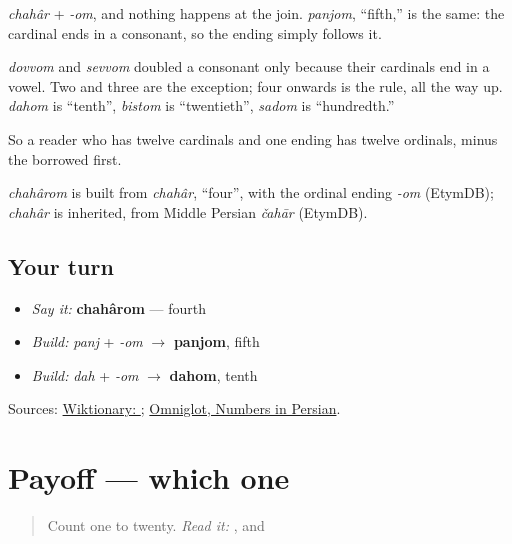 \emph{chahâr} + \emph{-om}, and nothing happens at the join. \emph{panjom}, \textquotedblleft{}fifth,\textquotedblright{} is the same: the cardinal ends in a consonant, so the ending simply follows it.

\emph{dovvom} and \emph{sevvom} doubled a consonant only because their cardinals end in a vowel. Two and three are the exception; four onwards is the rule, all the way up. \emph{dahom} is \textquotedblleft{}tenth\textquotedblright{}, \emph{bistom} is \textquotedblleft{}twentieth\textquotedblright{}, \emph{sadom} is \textquotedblleft{}hundredth.\textquotedblright{}

So a reader who has twelve cardinals and one ending has twelve ordinals, minus the borrowed first.

\begin{cousinweb}
\emph{chahârom} is built from \emph{chahâr}, \textquotedblleft{}four\textquotedblright{}, with the ordinal ending \emph{-om} (EtymDB); \emph{chahâr} is inherited, from Middle Persian \emph{čahār} (EtymDB).
\end{cousinweb}

\subsection*{Your turn}
\begin{itemize}
\raggedright
  \item \emph{Say it:} \textbf{chahârom} — fourth
  \item \emph{Build:} \emph{panj} + \emph{-om} $\to$ \textbf{panjom}, fifth
  \item \emph{Build:} \emph{dah} + \emph{-om} $\to$ \textbf{dahom}, tenth
\end{itemize}

\begin{tcolorbox}[breakable,colback=teal!4,colframe=teal!35!black,title={Before you move on}]
Sources: \href{https://en.wiktionary.org/wiki/\%DA\%86\%D9\%87\%D8\%A7\%D8\%B1\%D9\%85}{Wiktionary: }; \href{https://www.omniglot.com/language/numbers/persian.htm}{Omniglot, Numbers in Persian}.
\end{tcolorbox}
\section[Practice]{Payoff — which one}

\label{lesson:FA-C20-practice}



\begin{quote}
Count one to twenty. \emph{Read it:} \textbf{}, \textbf{} and \textbf{}
\end{quote}

